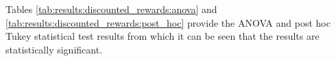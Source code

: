 Tables \ref{tab:results:discounted_rewards:anova} and \ref{tab:results:discounted_rewards:post_hoc} provide the ANOVA and post hoc Tukey statistical test results from which it can be seen that the results are statistically significant.


\begin{table}[htbp]
      \centering
      \caption{ANOVA - Rank - BHH Variant: Discounted Rewards}
      \label{tab:results:discounted_rewards:anova}%
      \par\bigskip
\end{table}


